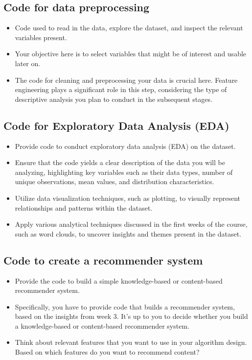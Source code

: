 \subsection{Code for data preprocessing}
\begin{itemize}
	\item Code used to read in the data, explore the dataset, and inspect the relevant variables present.
	\item Your objective here is to select variables that might be of interest and usable later on.
	\item The code for cleaning and preprocessing your data is crucial here. Feature engineering plays a significant role in this step, considering the type of descriptive analysis you plan to conduct in the subsequent stages.
\end{itemize}

\subsection{Code for Exploratory Data Analysis (EDA)}
\begin{itemize}
\item Provide code to conduct exploratory data analysis (EDA) on the dataset.
\item Ensure that the code yields a clear description of the data you will be analyzing, highlighting key variables such as their data types, number of unique observations, mean values, and distribution characteristics.
\item Utilize data visualization techniques, such as plotting, to visually represent relationships and patterns within the dataset.
\item Apply various analytical techniques discussed in the first weeks of the course, such as word clouds, to uncover insights and themes present in the dataset.
\end{itemize}

\subsection{Code to create a recommender system}

\begin{itemize}
	\item Provide the code to build a simple knowledge-based or content-based recommender system. 
	\item Specifically, you have to provide code that builds a recommender system, based on the insights from week 3. It's up to you to decide whether you build a knowledge-based or content-based recommender system.
	\item Think about relevant features that you want to use in your algorithm design. Based on which features do you want to recommend content?
\end{itemize}

